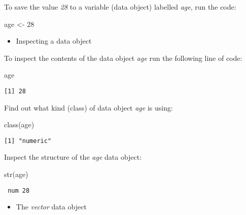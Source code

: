 \documentclass[
  letterpaper,
  krantz2]{style/krantz}
\newenvironment{Shaded}{\begin{snugshade}}{\end{snugshade}}
\newcommand{\DecValTok}[1]{\textcolor[rgb]{0.68,0.00,0.00}{#1}}
\newcommand{\FunctionTok}[1]{\textcolor[rgb]{0.28,0.35,0.67}{#1}}
\newcommand{\NormalTok}[1]{\textcolor[rgb]{0.00,0.23,0.31}{#1}}
\newcommand{\OtherTok}[1]{\textcolor[rgb]{0.00,0.23,0.31}{#1}}
\providecommand{\tightlist}{%
  \setlength{\itemsep}{0pt}\setlength{\parskip}{0pt}}\usepackage{longtable,booktabs,array}
\begin{document}
To save the value \emph{28} to a variable (data object) labelled
\emph{age}, run the code:

\begin{Shaded}
\begin{Highlighting}[]
\NormalTok{age }\OtherTok{\textless{}{-}} \DecValTok{28}
\end{Highlighting}
\end{Shaded}

\begin{itemize}
\tightlist
\item
  Inspecting a data object
\end{itemize}

To inspect the contents of the data object \emph{age} run the following
line of code:

\begin{Shaded}
\begin{Highlighting}[]
\NormalTok{age}
\end{Highlighting}
\end{Shaded}

\begin{verbatim}
[1] 28
\end{verbatim}

Find out what kind (class) of data object \emph{age} is using:

\begin{Shaded}
\begin{Highlighting}[]
\FunctionTok{class}\NormalTok{(age) }
\end{Highlighting}
\end{Shaded}

\begin{verbatim}
[1] "numeric"
\end{verbatim}

Inspect the structure of the \emph{age} data object:

\begin{Shaded}
\begin{Highlighting}[]
\FunctionTok{str}\NormalTok{(age) }
\end{Highlighting}
\end{Shaded}

\begin{verbatim}
 num 28
\end{verbatim}

\begin{itemize}
\tightlist
\item
  The \emph{vector} data object
\end{itemize}
\end{document}
